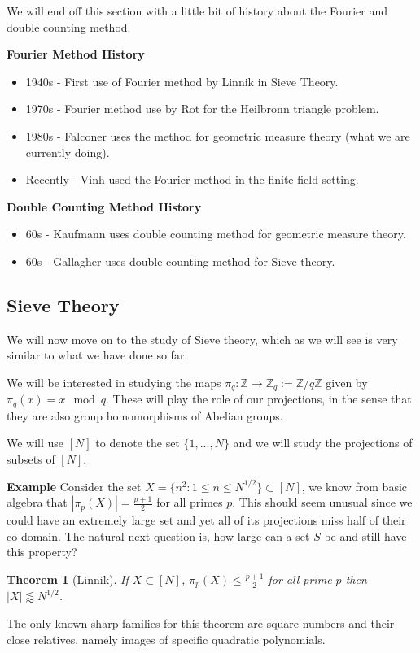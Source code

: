 \documentclass[12pt]{amsart}
\newtheorem{theorem}{Theorem}[section]
\newcommand{\ZZ}{\mathbb{Z}}
\begin{document}
We will end off this section with a little bit of history about the Fourier and double counting method. 

\textbf{Fourier Method History}
\begin{itemize}
    \item 1940s - First use of Fourier method by Linnik in Sieve Theory.
    \item 1970s - Fourier method use by Rot for the Heilbronn triangle problem.
    \item 1980s - Falconer uses the method for geometric measure theory (what we are currently doing).
    \item Recently - Vinh used the Fourier method in the finite field setting.
\end{itemize}

\textbf{Double Counting Method History}
\begin{itemize}
    \item 60s - Kaufmann uses double counting method for geometric measure theory.
    \item 60s - Gallagher uses double counting method for Sieve theory.
\end{itemize}
\subsection{Sieve Theory}
We will now move on to the study of Sieve theory, which as we will see is very similar to what we have done so far.

We will be interested in studying the maps $\pi_q : \ZZ \to \ZZ_q := \ZZ / q \ZZ$ given by $\pi_q (x) = x \mod{q}$. These will play the role of our projections, in the sense that they are also group homomorphisms of Abelian groups. 

We will use $[N]$ to denote the set $\{1,...,N\}$ and we will study the projections of subsets of $[N]$. 

\textbf{Example} Consider the set $X = \{ n^2 : 1 \leq n \leq N^{1/2}\} \subset [N]$, we know from basic algebra that $|\pi_p (X)| = \frac{p + 1}{2}$ for all primes $p$. This should seem unusual since we could have an extremely large set and yet all of its projections miss half of their co-domain. The natural next question is, how large can a set $S$ be and still have this property?

\begin{theorem}[Linnik]
    If $X \subset [N]$, $\pi_{p} (X) \leq \frac{p+1}{2}$ for all prime $p$ then $|X| \lessapprox N^{1/2}$.
\end{theorem} 
The only known sharp families for this theorem are square numbers and their close relatives, namely images of specific quadratic polynomials.
\end{document}
